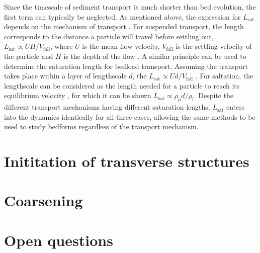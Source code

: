 \documentclass[12pt]{article}
\begin{document}
Since the timescale of sediment transport is much shorter than bed evolution, the first term can typically be neglected. As mentioned above, the expression for $L_{\text{sat}}$ depends on the mechanism of transport \citep{Andreotti12}. For suspended transport, the length corresponds to the distance a particle will travel before settling out, $L_{\text{sat}} \propto U H / V_{\text{fall}}$, where $U$ is the mean flow velocity, $V_{\text{fall}}$ is the settling velocity of the particle and $H$ is the depth of the flow \citep{Claudin11}. A similar principle can be used to determine the saturation length for bedload transport. Assuming the transport takes place within a layer of lengthscale $d$, the $L_{\text{sat}} \propto U d / V_{\text{fall}}$ \citep{Charru06}. For saltation, the lengthscale can be considered as the length needed for a particle to reach its equilibrium velocity \citep{Andreotti02}, for which it can be shown $L_{\text{sat}} \propto \rho_{\text{p}} d / \rho_{\text{f}}$. Despite the different transport mechanisms having different saturation lengths, $L_{\text{sat}}$ enters into the dynamics identically for all three cases, allowing the same methods to be used to study bedforms regardless of the transport mechanism.


\section{Inititation of transverse structures}
\label{sec:init}

\section{Coarsening}
\label{sec:coarse}

\section{Open questions}
\label{sec:openQs}





\end{document}
